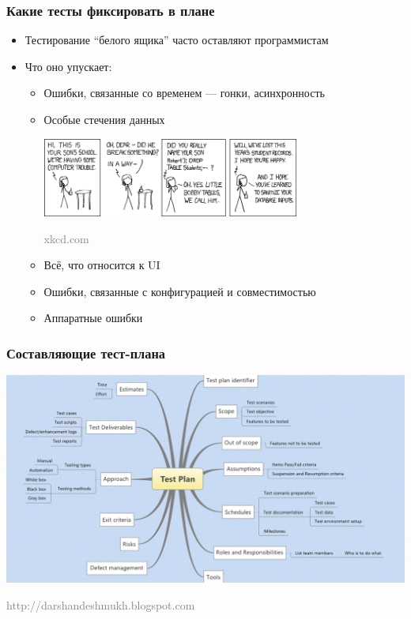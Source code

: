\documentclass[xetex,mathserif,serif]{beamer}
\newcommand{\attribution}[1] {
	\begin{flushright}\begin{scriptsize}\textcolor{gray}{\textcopyright\; #1}\end{scriptsize}\end{flushright}
}
\begin{document}
	\begin{frame}
		\frametitle{Какие тесты фиксировать в плане}
		\begin{itemize}
			\item Тестирование ``белого ящика'' часто оставляют программистам
			\item Что оно упускает:
			\begin{itemize}
				\item Ошибки, связанные со временем --- гонки, асинхронность
				\item Особые стечения данных
				\begin{center}
					\includegraphics[width=0.7\textwidth]{xkcd.png}
					\attribution{xkcd.com}
				\end{center}
				\item Всё, что относится к UI
				\item Ошибки, связанные с конфигурацией и совместимостью
				\item Аппаратные ошибки
			\end{itemize}
		\end{itemize}
	\end{frame}

	\begin{frame}
		\frametitle{Составляющие тест-плана}
		\begin{center}
			\includegraphics[width=\textwidth]{testPlan.png}
			\attribution{http://darshandeshmukh.blogspot.com}
		\end{center}
	\end{frame}
\end{document}

